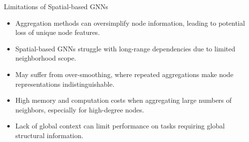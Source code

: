 \begin{frame}{Limitations of Spatial-based GNNs}
    \begin{itemize}
        \item Aggregation methods can oversimplify node information, leading to potential loss of unique node features.
        \item Spatial-based GNNs struggle with long-range dependencies due to limited neighborhood scope.
        \item May suffer from over-smoothing, where repeated aggregations make node representations indistinguishable.
        \item High memory and computation costs when aggregating large numbers of neighbors, especially for high-degree nodes.
        \item Lack of global context can limit performance on tasks requiring global structural information.
    \end{itemize}
\end{frame}